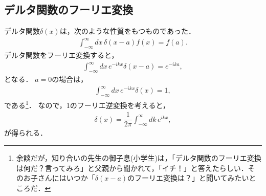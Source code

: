 \subsection{デルタ関数のフーリエ変換}
%
デルタ関数$\delta(x)$は，次のような性質をもつものであった．
\begin{align}
 \int_{-\infty}^{\infty}dx\,\delta\left(x-a\right)f\left(x\right) = f\left(a\right). 
\end{align}
%
デルタ関数をフーリエ変換すると，
\begin{align}
 \int_{-\infty}^{\infty}dx\,e^{-ikx}\delta\left(x-a\right) = e^{-ika},
\end{align}
となる．
%
$a=0$の場合は，
\begin{align}
 \int_{-\infty}^{\infty}dx\,e^{-ikx}\delta\left(x\right) = 1, 
\end{align}
である\footnote{余談だが，知り合いの先生の御子息(小学生)は，「デルタ関数のフーリエ変換は何だ？言ってみろ」と父親から聞かれて，「イチ！」と答えたらしい．そのお子さんにはいつか「$\delta(x-a)$のフーリエ変換は？」と聞いてみたいところだ．}．
%
なので，1のフーリエ逆変換を考えると，
\begin{align}
 \delta\left(x\right) = \dfrac{1}{2\pi}\int_{-\infty}^{\infty}dk\,e^{ikx}, 
\end{align}
が得られる．
%
